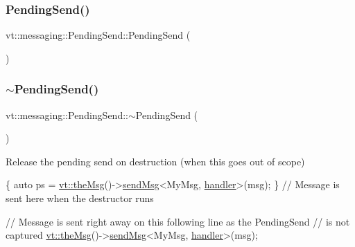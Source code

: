 \mbox{\label{structvt_1_1messaging_1_1_pending_send_a951912c336cf3cdaf91f8ccde13092af}} 
\subsubsection{\texorpdfstring{Pending\+Send()}{PendingSend()}\hspace{0.1cm}{\footnotesize\ttfamily [5/5]}}
{\footnotesize\ttfamily vt\+::messaging\+::\+Pending\+Send\+::\+Pending\+Send (\begin{DoxyParamCaption}\item[{const \hyperlink{structvt_1_1messaging_1_1_pending_send}{Pending\+Send} \&}]{ }\end{DoxyParamCaption})\hspace{0.3cm}{\ttfamily [delete]}}

\mbox{\label{structvt_1_1messaging_1_1_pending_send_ade803ff2903a92eaf62b6e330593871b}} 
\subsubsection{\texorpdfstring{$\sim$\+Pending\+Send()}{~PendingSend()}}
{\footnotesize\ttfamily vt\+::messaging\+::\+Pending\+Send\+::$\sim$\+Pending\+Send (\begin{DoxyParamCaption}{ }\end{DoxyParamCaption})\hspace{0.3cm}{\ttfamily [inline]}}



Release the pending send on destruction (when this goes out of scope) 


\begin{DoxyCode}
\{
  \textcolor{keyword}{auto} ps = \hyperlink{namespacevt_aeafd31f866aeb4dc6fc2f6ee97136350}{vt::theMsg}()->\hyperlink{group__preregister_ga55c6ea91181ae20c681e73a356750916}{sendMsg}<MyMsg, \hyperlink{namespacevt_1_1config_a6bd1d6215bda0d8ca02811798399f689a82a0081a94d5c5dfd18b0b3f7eca64b7}{handler}>(msg);
\} \textcolor{comment}{// Message is sent here when the destructor runs}

\textcolor{comment}{// Message is sent right away on this following line as the PendingSend}
\textcolor{comment}{// is not captured}
\hyperlink{namespacevt_aeafd31f866aeb4dc6fc2f6ee97136350}{vt::theMsg}()->\hyperlink{group__preregister_ga55c6ea91181ae20c681e73a356750916}{sendMsg}<MyMsg, \hyperlink{namespacevt_1_1config_a6bd1d6215bda0d8ca02811798399f689a82a0081a94d5c5dfd18b0b3f7eca64b7}{handler}>(msg);
\end{DoxyCode}
 

